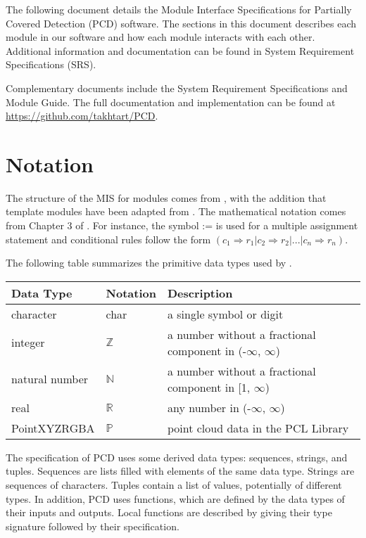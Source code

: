 \documentclass[12pt, titlepage]{article}
\begin{document}
The following document details the Module Interface Specifications for Partially Covered Detection (PCD) software. 
The sections in this document describes each module in our software and how each module interacts with each other. 
Additional information and documentation can be found in System Requirement Specifications (SRS).

Complementary documents include the System Requirement Specifications
and Module Guide.  The full documentation and implementation can be
found at \url{https://github.com/takhtart/PCD}. 

\section{Notation}

The structure of the MIS for modules comes from \citet{HoffmanAndStrooper1995},
with the addition that template modules have been adapted from
\cite{GhezziEtAl2003}.  The mathematical notation comes from Chapter 3 of
\citet{HoffmanAndStrooper1995}.  For instance, the symbol := is used for a
multiple assignment statement and conditional rules follow the form $(c_1
\Rightarrow r_1 | c_2 \Rightarrow r_2 | ... | c_n \Rightarrow r_n )$.

The following table summarizes the primitive data types used by \progname. 

\begin{center}
\renewcommand{\arraystretch}{1.2}
\noindent 
\begin{tabular}{l l p{7.5cm}} 
\toprule 
\textbf{Data Type} & \textbf{Notation} & \textbf{Description}\\ 
\midrule
character & char & a single symbol or digit\\
integer & $\mathbb{Z}$ & a number without a fractional component in (-$\infty$, $\infty$) \\
natural number & $\mathbb{N}$ & a number without a fractional component in [1, $\infty$) \\
real & $\mathbb{R}$ & any number in (-$\infty$, $\infty$)\\
PointXYZRGBA & $\mathbb{P}$ & point cloud data in the PCL Library\\
\bottomrule
\end{tabular} 
\end{center}

\noindent
The specification of PCD uses some derived data types: sequences, strings, and
tuples. Sequences are lists filled with elements of the same data type. Strings
are sequences of characters. Tuples contain a list of values, potentially of
different types. In addition, PCD uses functions, which
are defined by the data types of their inputs and outputs. Local functions are
described by giving their type signature followed by their specification.
\end{document}
